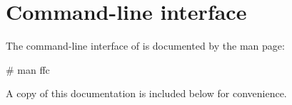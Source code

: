\chapter{Command-line interface}

The command-line interface of \ffc{} is documented by the
\ffc{} man page:
\begin{code}
# man ffc
\end{code}

A copy of this documentation
is included below for convenience.

\scriptsize
{}
\normalsize
